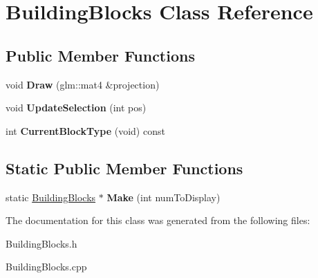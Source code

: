 \hypertarget{classBuildingBlocks}{\section{\-Building\-Blocks \-Class \-Reference}
\label{classBuildingBlocks}
}
\subsection*{\-Public \-Member \-Functions}
\begin{DoxyCompactItemize}
\item 
\hypertarget{classBuildingBlocks_aa28581a2b7760f7326a45e9281b063a4}{void {\bfseries \-Draw} (glm\-::mat4 \&projection)}\label{classBuildingBlocks_aa28581a2b7760f7326a45e9281b063a4}

\item 
\hypertarget{classBuildingBlocks_a03c7abbb552b6377baa59afb14ea0f9f}{void {\bfseries \-Update\-Selection} (int pos)}\label{classBuildingBlocks_a03c7abbb552b6377baa59afb14ea0f9f}

\item 
\hypertarget{classBuildingBlocks_a6e349af5b6aff954c38c589dacbfbfc1}{int {\bfseries \-Current\-Block\-Type} (void) const }\label{classBuildingBlocks_a6e349af5b6aff954c38c589dacbfbfc1}

\end{DoxyCompactItemize}
\subsection*{\-Static \-Public \-Member \-Functions}
\begin{DoxyCompactItemize}
\item 
\hypertarget{classBuildingBlocks_a14df4c7f3de3628ee79fbec433d534b7}{static \hyperlink{classBuildingBlocks}{\-Building\-Blocks} $\ast$ {\bfseries \-Make} (int num\-To\-Display)}\label{classBuildingBlocks_a14df4c7f3de3628ee79fbec433d534b7}

\end{DoxyCompactItemize}


\-The documentation for this class was generated from the following files\-:\begin{DoxyCompactItemize}
\item 
\-Building\-Blocks.\-h\item 
\-Building\-Blocks.\-cpp\end{DoxyCompactItemize}
